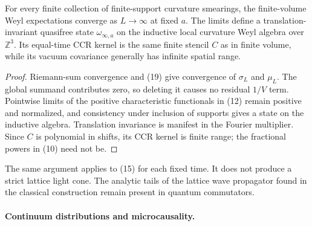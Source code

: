 \begin{theorem}
For every finite collection of finite-support curvature smearings, the
finite-volume Weyl expectations converge as $L\to\infty$ at fixed $a$.  The
limits define a translation-invariant quasifree state $\omega_{\infty,a}$ on
the inductive local curvature Weyl algebra over $\mathbb Z^3$.  Its equal-time
CCR kernel is the same finite stencil $C$ as in finite volume, while its
vacuum covariance generally has infinite spatial range.
\end{theorem}

\begin{proof}
Riemann-sum convergence and (19) give convergence of $\sigma_L$ and $\mu_L$.
The global summand contributes zero, so deleting it causes no residual
$1/V$ term.  Pointwise limits of the positive characteristic functionals in
(12) remain positive and normalized, and consistency under inclusion of
supports gives a state on the inductive algebra.  Translation invariance is
manifest in the Fourier multiplier.  Since $C$ is polynomial in shifts, its
CCR kernel is finite range; the fractional powers in (10) need not be.
\end{proof}

The same argument applies to (15) for each fixed time.  It does not produce a
strict lattice light cone.  The analytic tails of the lattice wave propagator
found in the classical construction remain present in quantum commutators.

\paragraph{Continuum distributions and microcausality.}

